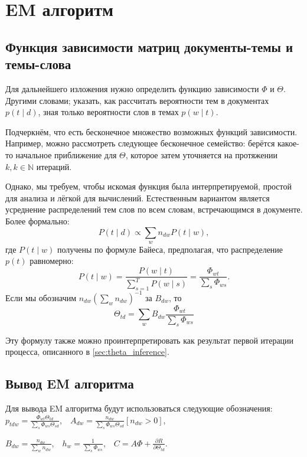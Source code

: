 \section{EM алгоритм}
\subsection{Функция зависимости матриц документы-темы и темы-слова}
Для дальнейшего изложения нужно определить функцию зависимости $\Phi$ и $\Theta$. Другими словами; указать, как рассчитать вероятности тем в документах $p(t\mid d)$, зная только вероятности слов в темах $p(w\mid t)$.

Подчеркнём, что есть бесконечное множество возможных функций зависимости. Например, можно рассмотреть следующее бесконечное семейство: берётся какое-то начальное приближение для $\Theta$, которое затем уточняется на протяжении $k, k \in \mathbb{N}$ итераций.

Однако, мы требуем, чтобы искомая функция была интерпретируемой, простой для анализа и лёгкой для вычислений. Естественным вариантом является усреднение распределений тем слов по всем словам, встречающимся в документе. Более формально:  
\[
P(t \mid d) \propto \sum_w n_{dw} P(t \mid w),
\]
где $P(t \mid w)$ получены по формуле Байеса, предполагая, что распределение $p(t)$ равномерно:
\[
P(t \mid w) = \frac{P(w \mid t)}{\sum_{s=1}^T P(w \mid s)} = \frac{\Phi_{wt}}{\sum_s \Phi_{ws}}.
\]
Если мы обозначим $n_{dw}(\sum_w n_{dw})^{-1}$ за $B_{dw}$, то
\begin{equation} \label{eq:thetaform}
\Theta_{td} = \sum_{w} B_{dw} \frac{\Phi_{wt}}{\sum_s \Phi_{ws}}
\end{equation}

Эту формулу также можно проинтерпретировать как результат первой итерации процесса, описанного в \ref{sec:theta_inference}.

\subsection{Вывод EM алгоритма}
Для вывода EM алгоритма будут использоваться следующие обозначения:\\

$p_{tdw} = \displaystyle\frac{\Phi_{wt} \Theta_{td}}{\sum_s \Phi_{ws} \Theta_{sd}}$,~~$A_{dw} = \displaystyle\frac {n_{dw}}{\sum_s \Phi_{ws} \Theta_{sd}}[n_{dw} > 0]$,

$B_{dw} = \displaystyle\frac{n_{dw}}{\sum_w n_{dw}}$,~~$h_w = \displaystyle\frac{1}{\sum_s \Phi_{ws}}$,~~$C =  A \Phi + \displaystyle\frac{\partial{R}}{\partial{\Theta_{td}}}$.

